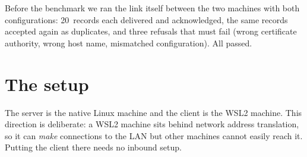 \documentclass[11pt,a4paper]{article}
\begin{document}
Before the benchmark we ran the link itself between the two machines with both configurations:
20~records each delivered and acknowledged, the same records accepted again as duplicates, and
three refusals that must fail (wrong certificate authority, wrong host name, mismatched
configuration). All passed.

\section{The setup}

The server is the native Linux machine and the client is the WSL2 machine. This direction is
deliberate: a WSL2 machine sits behind network address translation, so it can \emph{make}
connections to the LAN but other machines cannot easily reach it. Putting the client there needs no
inbound setup.
\end{document}
